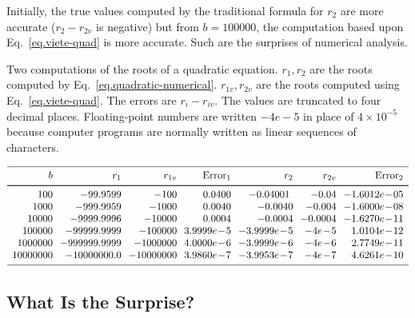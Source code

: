 Initially, the true values computed by the traditional formula for $r_2$ are more accurate ($r_2-r_{2v}$ is negative) but from $b=100000$, the computation based upon Eq.~\ref{eq.viete-quad} is more accurate. Such are the surprises of numerical analysis.

\begin{table}[bht]
\caption[Two computations of the roots of a quadratic equation]{Two computations of the roots of a quadratic equation. $r_1,r_2$ are the roots computed by Eq.~\ref{eq.quadratic-numerical}. $r_{1v},r_{2v}$ are the roots computed using Eq.~\ref{eq.viete-quad}. The errors are $r_{i}-r_{iv}$. The values are truncated to four decimal places.
Floating-point numbers are written $-4e-5$ in place of $4\times 10^{-5}$ because computer programs are normally written as linear sequences of characters.} \label{t.quadratic}
\[
\begin{array}{r@{\hspace{2.5mm}}r@{\hspace{2.5mm}}r@{\hspace{2.5mm}}r@{\hspace{2.5mm}}r@{\hspace{2.5mm}}r@{\hspace{2.5mm}}r}
\hline
\noalign{\smallskip}
b & r_1 & r_{1v} & \mathrm{Error}_1 & r_2 & r_{2v} & \mathrm{Error}_2\\
\noalign{\smallskip}\svhline\noalign{\smallskip}
100  &  -99.9599  &  -100  &  0.0400  &  -0.04001\  &  -0.04  &  -1.6012e\!-\!05\\
1000  &  -999.9959  &  -1000  &  0.0040  &  -0.0040  &  -0.004  &  -1.6000e\!-\!08\\
10000  &  -9999.9996  &  -10000  &  0.0004  &  -0.0004  &  -0.0004  &  -1.6270e\!-\!11\\
100000  &  -99999.9999  &  -100000  &  3.9999e\!-\!5  &  -3.9999e\!-\!5  &  -4e\!-\!5  &  1.0104e\!-\!12\\
1000000  &  -999999.9999  &  -1000000  &  4.0000e\!-\!6  &  -3.9999e\!-\!6  &  -4e\!-\!6  &  2.7749e\!-\!11\\
10000000  &  -10000000.0  &  -10000000  &  3.9860e\!-\!7  &  -3.9953e\!-\!7  &  -4e\!-\!7  &  4.6261e\!-\!10\\
 \noalign{\smallskip}
 \hline
\end{array}
\]
\end{table}

\newpage

\subsection*{What Is the Surprise?}

